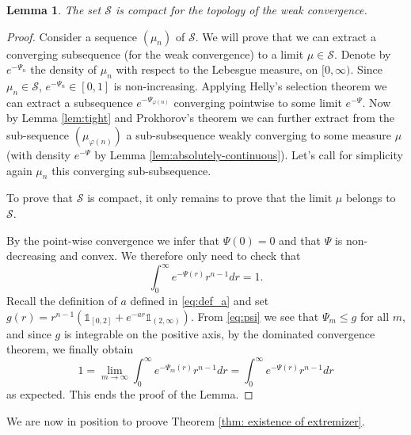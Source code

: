 \documentclass[11pt]{article}
\newtheorem{lemma}[conjecture]{Lemma}
\newcommand{\1}{[1]}
\begin{document}
\begin{lemma} \label{lem:compact}
    The set $\mathcal{S}$ is compact  for the topology of the weak convergence.
\end{lemma}


\begin{proof}
    Consider a sequence $(\mu_n)$ of $\mathcal{S}$. We will prove that we can extract a converging subsequence (for the weak convergence) to a limit $\mu \in \mathcal{S}$.
     Denote by $e^{-\Psi_n}$ the density of $\mu_n$ with respect to the Lebesgue measure,
on $[0,\infty)$. Since $\mu_n \in \mathcal{S}$, $e^{-\Psi_n} \in [0,1]$ is non-increasing. Applying Helly's selection theorem we can extract a subsequence
$e^{-\Psi_{\varphi(n)}}$ converging pointwise to some limit $e^{-\Psi}$. Now by Lemma \ref{lem:tight} and Prokhorov's theorem we can further extract from the sub-sequence $(\mu_{\varphi(n)})$ a sub-subsequence weakly converging to some measure $\mu$ (with density $e^{-\Psi}$ by Lemma \ref{lem:absolutely-continuous}). Let's call for simplicity again $\mu_n$ this converging sub-subsequence.

To prove that $\mathcal{S}$ is compact, it only remains to prove that the limit $\mu$ belongs to $\mathcal{S}$. 

By the point-wise convergence we infer that $\Psi(0)=0$ and that $\Psi$ is non-decreasing and convex. We therefore only need to check that
$$
\int_{0}^{\infty}e^{-\Psi(r)}r^{n-1}dr=1.
$$
Recall the definition of $a$ defined in \eqref{eq:def_a}
and set $g(r)=r^{n-1} \left(\mathds{1}_{[0,2]} + e^{-ar}\mathds{1}_{(2,\infty)}\right)$. From \eqref{eq:psi} we see that $\Psi_m \leq g$ for all $m$, and since $g$ is integrable on the positive axis, by the dominated convergence theorem, we finally obtain
$$
1 = \lim_{m \to \infty} \int_0^\infty e^{-\Psi_m(r)}r^{n-1}dr = \int_0^\infty e^{-\Psi(r)}r^{n-1}dr
$$
as expected. This ends the proof of the Lemma.
\end{proof}
    
We are now in position to proove Theorem \ref{thm: existence of extremizer}.
\end{document}

